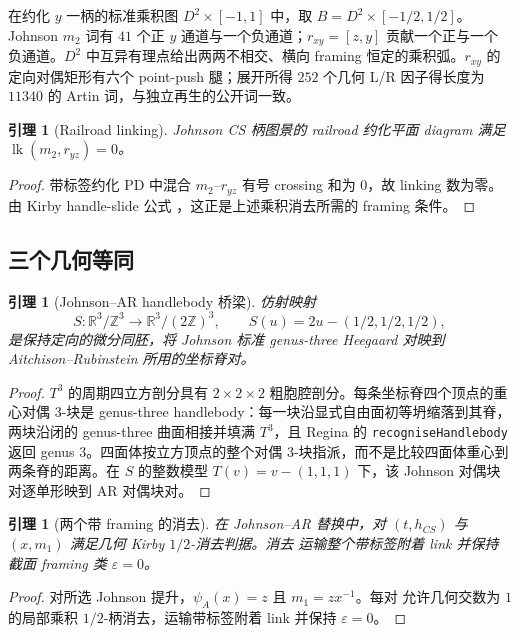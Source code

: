 \documentclass[11pt]{amsart}
\newtheorem{lemma}[theorem]{引理}
\theoremstyle{definition}
\theoremstyle{remark}
\begin{document}
在约化 $y$ 一柄的标准乘积图 $D^2\times[-1,1]$ 中，取 $B=D^2\times[-1/2,1/2]$。Johnson $m_2$ 词有 $41$ 个正 $y$ 通道与一个负通道；$r_{xy}=[z,y]$ 贡献一个正与一个负通道。$D^2$ 中互异有理点给出两两不相交、横向 framing 恒定的乘积弧。$r_{xy}$ 的定向对偶矩形有六个 point-push 腿；展开所得 $252$ 个几何 L/R 因子得长度为 $11340$ 的 Artin 词，与独立再生的公开词一致。

\begin{lemma}[Railroad linking]\label{lem:P0d-link}
Johnson CS 柄图景的 railroad 约化平面 diagram 满足
$\operatorname{lk}(m_2,r_{yz})=0$。
\end{lemma}

\begin{proof}
带标签约化 PD 中混合 $m_2$--$r_{yz}$ 有号 crossing 和为
$0$，故 linking 数为零。由 Kirby handle-slide 公式
\cite{Kirby1978}，这正是上述乘积消去所需的 framing 条件。
\end{proof}

\subsection{三个几何等同}

\begin{lemma}[Johnson--AR handlebody 桥梁]\label{lem:P0a}
仿射映射
\[
S:\mathbb R^3/\mathbb Z^3\longrightarrow
\mathbb R^3/(2\mathbb Z)^3,\qquad
S(u)=2u-(1/2,1/2,1/2),
\]
是保持定向的微分同胚，将 Johnson 标准
genus-three Heegaard 对映到 Aitchison--Rubinstein 所用的坐标脊对。
\end{lemma}

\begin{proof}
$T^3$ 的周期四立方剖分具有 $2\times 2\times 2$ 粗胞腔剖分。每条坐标脊四个顶点的重心对偶 $3$-块是 genus-three handlebody：每一块沿显式自由面初等坍缩落到其脊，两块沿闭的 genus-three 曲面相接并填满 $T^3$，且 Regina 的 \texttt{recogniseHandlebody} 返回 genus $3$。四面体按立方顶点的整个对偶 $3$-块指派，而不是比较四面体重心到两条脊的距离。在 $S$ 的整数模型 $T(v)=v-(1,1,1)$ 下，该 Johnson 对偶块对逐单形映到 AR 对偶块对。
\end{proof}

\begin{lemma}[两个带 framing 的消去]\label{lem:P0b}
在 Johnson--AR 替换中，对 \((t,h_{CS})\) 与 \((x,m_1)\)
满足几何 Kirby \(1/2\)-消去判据。消去
运输整个带标签附着 link 并保持截面 framing 类 \(\varepsilon=0\)。
\end{lemma}

\begin{proof}
对所选 Johnson 提升，$\psi_A(x)=z$ 且 $m_1=zx^{-1}$。每对
允许几何交数为 $1$ 的局部乘积 $1/2$-柄消去，运输带标签附着 link 并保持
$\varepsilon=0$。
\end{proof}
\end{document}
